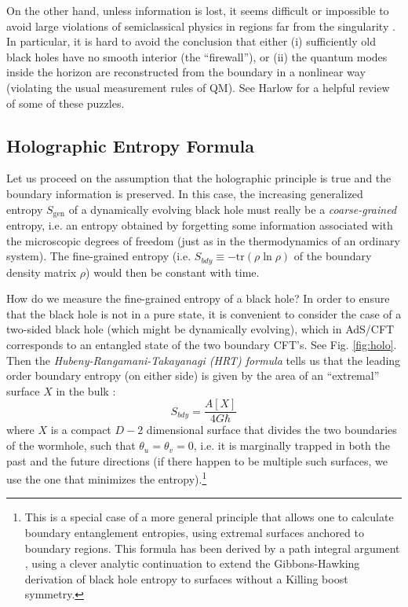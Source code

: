 \documentclass[12pt,a4paper]{article}
\def\be{\begin{equation}}
\def\ee{\end{equation}}
\begin{document}
On the other hand, unless information is lost, it seems difficult or impossible to avoid large violations of semiclassical physics in regions far from the singularity \cite{Mathur:2009hf,Almheiri:2012rt,Almheiri:2013hfa,Braunstein:2009my}.  In particular, it is hard to avoid the conclusion that either (i) sufficiently old black holes have no smooth interior (the ``firewall''), or (ii) the quantum modes inside the horizon are reconstructed from the boundary in a nonlinear way (violating the usual measurement rules of QM).  See Harlow \cite{harlow} for a helpful review of some of these puzzles.

\subsection{Holographic Entropy Formula}\label{HEF}

Let us proceed on the assumption that the holographic principle is true and the boundary information is preserved.  In this case, the increasing generalized entropy $S_\mathrm{gen}$ of a dynamically evolving black hole must really be a \emph{coarse-grained} entropy, i.e. an entropy obtained by forgetting some information associated with the microscopic degrees of freedom (just as in the thermodynamics of an ordinary system).  The fine-grained entropy (i.e. $S_{bdy} \equiv -\mathrm{tr}\left(\rho \ln \rho \right)$ of the boundary density matrix $\rho$) would then be constant with time.

How do we measure the fine-grained entropy of a black hole?  In order to ensure that the black hole is not in a pure state, it is convenient to consider the case of a two-sided black hole (which might be dynamically evolving), which in AdS/CFT corresponds to an entangled state of the two boundary CFT's.  See Fig. \ref{fig:holo}. Then the \emph{Hubeny-Rangamani-Takayanagi (HRT) formula} tells us that the leading order boundary entropy (on either side) is given by the area of an ``extremal'' surface $X$ in the bulk \cite{Hubeny:2007xt,Headrick:2007km,Ryu:2006bv}:
\be\label{HRT}
S_{bdy} = \frac{A[X]}{4G\hbar}
\ee
where $X$ is a compact $D-2$ dimensional surface that divides the two boundaries of the wormhole, such that $\theta_{u} = \theta_{v} = 0$, i.e. it is marginally trapped in both the past and the future directions (if there happen to be multiple such surfaces, we use the one that minimizes the entropy).\footnote{This is a special case of a more general principle that allows one to calculate boundary entanglement entropies, using extremal surfaces anchored to boundary regions. This formula has been derived by a path integral argument \cite{lewkowycz}, using a clever analytic continuation to extend the Gibbons-Hawking derivation \cite{gibbons1977action} of black hole entropy to surfaces without a Killing boost symmetry.}
\end{document}
